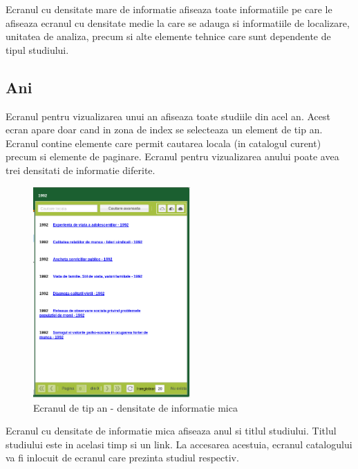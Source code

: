 Ecranul cu densitate mare de informatie afiseaza toate informatiile
pe care le afiseaza ecranul cu densitate medie la care se adauga si
informatiile de localizare, unitatea de analiza, precum si alte elemente
tehnice care sunt dependente de tipul studiului. 

\subsection{Ani}

Ecranul pentru vizualizarea unui an afiseaza toate studiile din acel
an. Acest ecran apare doar cand in zona de index se selecteaza un
element de tip an. Ecranul contine elemente care permit cautarea locala
(in catalogul curent) precum si elemente de paginare. Ecranul pentru
vizualizarea anului poate avea trei densitati de informatie diferite. 

\begin{figure}[H]
\begin{centering}
\includegraphics[width=6cm]{screenshots/details-panel-an-simple}
\par\end{centering}
\caption{Ecranul de tip an - densitate de informatie mica}
\end{figure}

Ecranul cu densitate de informatie mica afiseaza anul si titlul studiului.
Titlul studiului este in acelasi timp si un link. La accesarea acestuia,
ecranul catalogului va fi inlocuit de ecranul care prezinta studiul
respectiv. 

